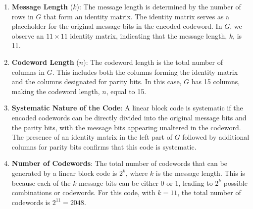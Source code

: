 \documentclass[12pt]{article}
\begin{document}
\begin{enumerate}
    \item \textbf{Message Length} (\(k\)): The message length is determined by the number of rows in \(G\) that form an identity matrix. The identity matrix serves as a placeholder for the original message bits in the encoded codeword. In \(G\), we observe an \(11 \times 11\) identity matrix, indicating that the message length, \(k\), is 11.
    
    \item \textbf{Codeword Length} (\(n\)): The codeword length is the total number of columns in \(G\). This includes both the columns forming the identity matrix and the columns designated for parity bits. In this case, \(G\) has 15 columns, making the codeword length, \(n\), equal to 15.
    
    \item \textbf{Systematic Nature of the Code}: A linear block code is systematic if the encoded codewords can be directly divided into the original message bits and the parity bits, with the message bits appearing unaltered in the codeword. The presence of an identity matrix in the left part of \(G\) followed by additional columns for parity bits confirms that this code is systematic.
    
    \item \textbf{Number of Codewords}: The total number of codewords that can be generated by a linear block code is \(2^k\), where \(k\) is the message length. This is because each of the \(k\) message bits can be either 0 or 1, leading to \(2^k\) possible combinations or codewords. For this code, with \(k = 11\), the total number of codewords is \(2^{11} = 2048\). 
\end{enumerate}
\end{document}
